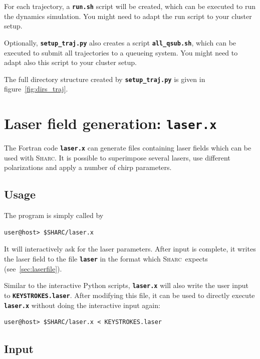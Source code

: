 \documentclass[a4paper,10pt,DIV=15,openany,twoside=false]{scrbook}
\newcommand{\sharc}{\textsc{Sharc}}
\newcommand{\ttt}[1]{\textbf{\texttt{#1}}}
\begin{document}
For each trajectory, a \ttt{run.sh} script will be created, which can be executed to run the dynamics simulation. You might need to adapt the run script to your cluster setup.

Optionally, \ttt{setup\_traj.py} also creates a script \ttt{all\_qsub.sh}, which can be executed to submit all trajectories to a queueing system. You might need to adapt also this script to your cluster setup.

The full directory structure created by \ttt{setup\_traj.py} is given in figure~\ref{fig:dirs_traj}.








\section{Laser field generation: \ttt{laser.x}}\label{sec:laser.x}

The Fortran code \ttt{laser.x} can generate files containing laser fields which can be used with \sharc. It is possible to superimpose several lasers, use different polarizations and apply a number of chirp parameters.

\subsection{Usage}

The program is simply called by 
\begin{verbatim}
user@host> $SHARC/laser.x
\end{verbatim}
It will interactively ask for the laser parameters. After input is complete, it writes the laser field to the file \ttt{laser} in the format which \sharc\ expects (see~\ref{sec:laserfile}).

Similar to the interactive Python scripts, \ttt{laser.x} will also write the user input to \ttt{KEYSTROKES.laser}. After modifying this file, it can be used to directly execute \ttt{laser.x} without doing the interactive input again:
\begin{verbatim}
user@host> $SHARC/laser.x < KEYSTROKES.laser
\end{verbatim}

\subsection{Input}
\end{document}

